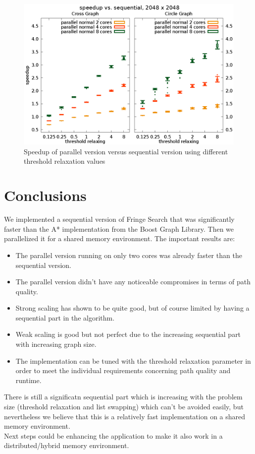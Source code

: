 \documentclass[letterpaper]{article}
\begin{document}
\begin{figure}[h]\centering
  \includegraphics[scale=0.558]{speedup_threshold.eps}
  \caption{Speedup of parallel version versus sequential version using different threshold relaxation values\label{fig:speedup_thresh}}
\end{figure}


\section{Conclusions}

We implemented a sequential version of Fringe Search that was significantly faster than the A* implementation from the Boost Graph Library. Then we parallelized it for a shared memory environment. The important results are:
\begin{itemize}
\item The parallel version running on only two cores was already faster than the sequential version.
\item The parallel version didn't have any noticeable compromises in terms of path quality.
\item Strong scaling has shown to be quite good, but of course limited by having a sequential part in the algorithm.
\item Weak scaling is good but not perfect due to the increasing sequential part with increasing graph size.
\item The implementation can be tuned with the threshold relaxation parameter in order to meet the individual requirements concerning path quality and runtime.
\end{itemize}
There is still a significatn sequential part which is increasing with the problem size (threshold relaxation and list swapping) which can't be avoided easily, but nevertheless we believe that this is a relatively fast implementation on a shared memory environment.\\
Next steps could be enhancing the application to make it also work in a distributed/hybrid memory environment.





\end{document}

